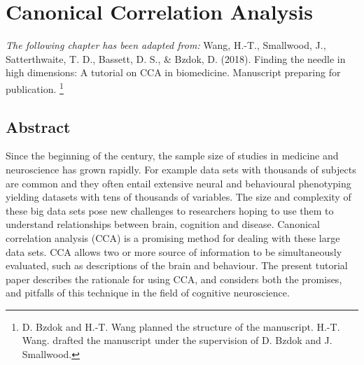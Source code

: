 \chapter{Canonical Correlation Analysis}
\label{ch:methods}


\textit{The following chapter has been adapted from:}
Wang, H.-T., Smallwood, J., Satterthwaite, T. D., Bassett, D. S., \& Bzdok, D. (2018). Finding the needle in high dimensions: A tutorial on CCA in biomedicine. Manuscript preparing for publication.
\footnote{D. Bzdok and H.-T. Wang planned the structure of the manuscript.  H.-T. Wang. drafted the manuscript under the supervision of D. Bzdok and J. Smallwood.}
\section{Abstract}

Since the beginning of the  century, the sample size of studies in medicine and neuroscience has grown rapidly. For example data sets with thousands of subjects are common and they often entail extensive neural and behavioural phenotyping yielding datasets with tens of thousands of variables. The size and complexity of these big data sets pose new challenges to researchers hoping to use them to understand relationships between brain, cognition and disease. Canonical correlation analysis (CCA) is a promising method for dealing with these large data sets. CCA allows two or more source of information to be simultaneously evaluated, such as descriptions of the brain and behaviour. The present tutorial paper describes the rationale for using CCA, and considers both the promises, and pitfalls of this technique in the field of cognitive neuroscience.


